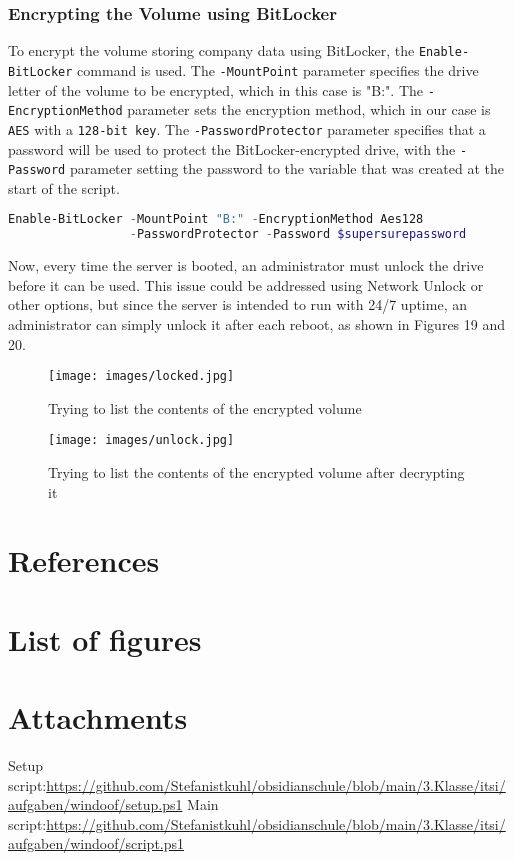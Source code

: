 \documentclass[a4paper]{article}
\newcommand{\abc}{\hfill \break}
\begin{document}
\subsubsection{Encrypting the Volume using BitLocker}
To encrypt the volume storing company data using BitLocker, the \texttt{Enable-BitLocker} command is used. The \texttt{-MountPoint} parameter specifies the drive letter of the volume to be encrypted, which in this case is "B:". The \texttt{-EncryptionMethod} parameter sets the encryption method, which in our case is \texttt{AES} with a \texttt{128-bit key}. The \texttt{-PasswordProtector} parameter specifies that a password will be used to protect the BitLocker-encrypted drive, with the \texttt{-Password} parameter setting the password to the variable that was created at the start of the script. \cite{Enable-BitLocker}
\begin{lstlisting}[language=PowerShell]
Enable-BitLocker -MountPoint "B:" -EncryptionMethod Aes128 
                 -PasswordProtector -Password $supersurepassword
\end{lstlisting}
Now, every time the server is booted, an administrator must unlock the drive before it can be used. This issue could be addressed using Network Unlock or other options, but since the server is intended to run with 24/7 uptime, an administrator can simply unlock it after each reboot, as shown in Figures 19 and 20.\abc
\begin{figure}[!htbp]
	\texttt{[image: images/locked.jpg]}
	\centering
	\caption{Trying to list the contents of the encrypted volume}
\end{figure}\newpage
\begin{figure}[h]
	\texttt{[image: images/unlock.jpg]}
	\centering
	\caption{Trying to list the contents of the encrypted volume after decrypting it}
\end{figure}


\newpage
\section{References}

\newpage
\section{List of figures}

\listoffigures
\newpage
\section{Attachments}
Setup script:\abc \url{https://github.com/Stefanistkuhl/obsidianschule/blob/main/3.Klasse/itsi/aufgaben/windoof/setup.ps1}
Main script:\abc \url{https://github.com/Stefanistkuhl/obsidianschule/blob/main/3.Klasse/itsi/aufgaben/windoof/script.ps1}
\end{document}
